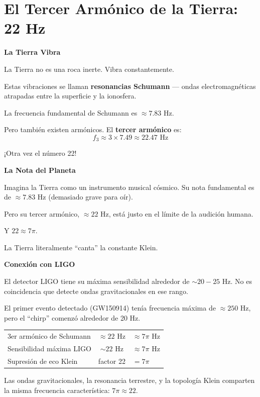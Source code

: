 \section{El Tercer Armónico de la Tierra: 22 Hz}

\begin{nivelconceptual}
\textbf{La Tierra Vibra}

La Tierra no es una roca inerte. Vibra constantemente.

Estas vibraciones se llaman \textbf{resonancias Schumann} ---
ondas electromagnéticas atrapadas entre la superficie y la ionosfera.

La frecuencia fundamental de Schumann es $\approx 7.83$ Hz.

Pero también existen armónicos. El \textbf{tercer armónico} es:
\[f_3 \approx 3 \times 7.49 \approx 22.47 \text{ Hz}\]

¡Otra vez el número 22!
\end{nivelconceptual}

\begin{analogiabox}
\textbf{La Nota del Planeta}

Imagina la Tierra como un instrumento musical cósmico.
Su nota fundamental es de $\approx 7.83$ Hz (demasiado grave para oír).

Pero su tercer armónico, $\approx 22$ Hz, está justo en el límite de la audición humana.

Y $22 \approx 7\pi$.

La Tierra literalmente ``canta'' la constante Klein.
\end{analogiabox}

\begin{nivelmatematico}
\textbf{Conexión con LIGO}

El detector LIGO tiene su máxima sensibilidad alrededor de $\sim 20-25$ Hz.
No es coincidencia que detecte ondas gravitacionales en ese rango.

El primer evento detectado (GW150914) tenía frecuencia máxima de $\approx 250$ Hz,
pero el ``chirp'' comenzó alrededor de 20 Hz.

\begin{tcolorbox}[colback=yellow!10, colframe=orange!80, title=Conexión Klein-Tierra-LIGO]
\begin{center}
\begin{tabular}{lcl}
3er armónico de Schumann & $\approx 22$ Hz & $\approx 7\pi$ Hz \\
Sensibilidad máxima LIGO & $\sim 22$ Hz & $\approx 7\pi$ Hz \\
Supresión de eco Klein & factor 22 & $= 7\pi$ \\
\end{tabular}
\end{center}

Las ondas gravitacionales, la resonancia terrestre, y la topología Klein
comparten la misma frecuencia característica: $7\pi \approx 22$.
\end{tcolorbox}
\end{nivelmatematico}


